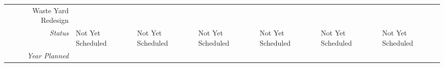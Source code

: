 \begin{tabularx}{\textwidth}{r|X|X|X|X|X|X|}
\multicolumn{1}{|V{.2\columnwidth}|}{\cellcolor{ccorangelight}Waste Yard Redesign}          &                                                                  &                                                                  &                                                                  &                                                                  &                                                                  &                                                                  \\
    \multicolumn{1}{|r|}{\cellcolor{ccorangelight}\textit{Status}}                & Not Yet Scheduled                                                         & Not Yet Scheduled                                                         & Not Yet Scheduled                                                         & Not Yet Scheduled                                                         & Not Yet Scheduled                                                         & Not Yet Scheduled                                                         \\
    \multicolumn{1}{|r|}{\cellcolor{ccorangelight}\textit{Year Planned}}                  &                                                      &                                                      &                                                      &                                                      &                                                      &                                                      \\ \hline
\end{tabularx}